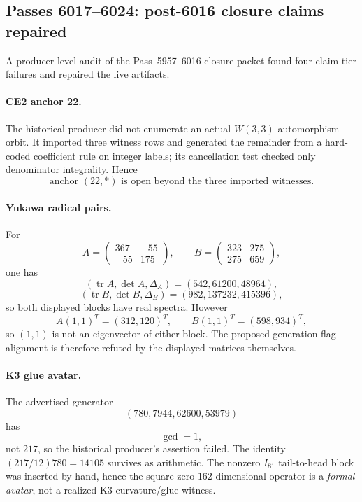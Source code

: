 \subsection*{Passes 6017--6024: post-6016 closure claims repaired}

A producer-level audit of the Pass~5957--6016 closure packet found four
claim-tier failures and repaired the live artifacts.

\paragraph{CE2 anchor 22.}
The historical producer did not enumerate an actual $W(3,3)$ automorphism
orbit.  It imported three witness rows and generated the remainder from a
hard-coded coefficient rule on integer labels; its cancellation test checked
only denominator integrality.  Hence
\[
\boxed{\text{anchor }(22,*)\text{ is open beyond the three imported witnesses}.}
\]

\paragraph{Yukawa radical pairs.}
For
\[
A=\begin{pmatrix}367&-55\\-55&175\end{pmatrix},\qquad
B=\begin{pmatrix}323&275\\275&659\end{pmatrix},
\]
one has
\[
(\operatorname{tr}A,\det A,\Delta_A)=(542,61200,48964),
\]
\[
(\operatorname{tr}B,\det B,\Delta_B)=(982,137232,415396),
\]
so both displayed blocks have real spectra.  However
\[
A(1,1)^T=(312,120)^T,\qquad B(1,1)^T=(598,934)^T,
\]
so $(1,1)$ is not an eigenvector of either block.  The proposed generation-flag
alignment is therefore refuted by the displayed matrices themselves.

\paragraph{K3 glue avatar.}
The advertised generator
\[
(780,7944,62600,53979)
\]
has
\[
\boxed{\gcd=1},
\]
not $217$, so the historical producer's assertion failed.  The identity
$(217/12)780=14105$ survives as arithmetic.  The nonzero $I_{81}$ tail-to-head
block was inserted by hand, hence the square-zero $162$-dimensional operator is
a \emph{formal avatar}, not a realized K3 curvature/glue witness.

